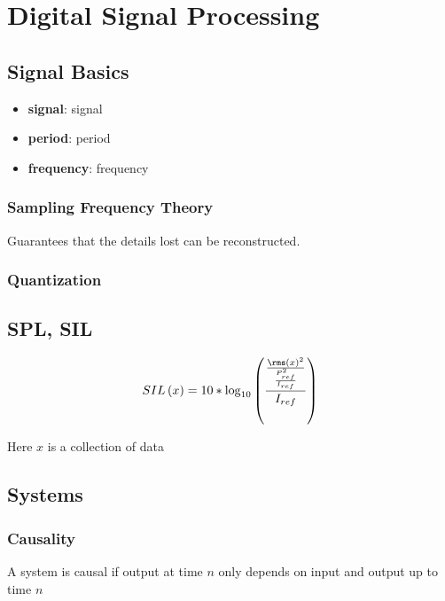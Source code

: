 \chapter{Digital Signal Processing}

\section{Signal Basics}

  \begin{itemize}
    \item \textbf{\Gls{signal}}: \glsdesc{signal}
    \item \textbf{\Gls{period}}: \glsdesc{period}
    \item \textbf{\Gls{frequency}}: \glsdesc{frequency}
  \end{itemize}

  \subsection{Sampling Frequency Theory}

    Guarantees that the details lost can be reconstructed.

  \subsection{Quantization}

\section{SPL, SIL}

  \begin{equation}
    SIL\left( x \right) = 10 * \log_{10}
    \left(
      \frac
      {
        \frac
        {
          \rms\left( x \right)^{2}
        }
        {
          \frac{P_{ref}^{2}}{I_{ref}}
        }
      }
      {I_{ref}}
    \right)
  \end{equation}

  Here $ x $ is a collection of data

\section{Systems}

  \subsection{Causality}

    A system is causal if output at time $ n $ only depends on input and output
    up to time $ n $

